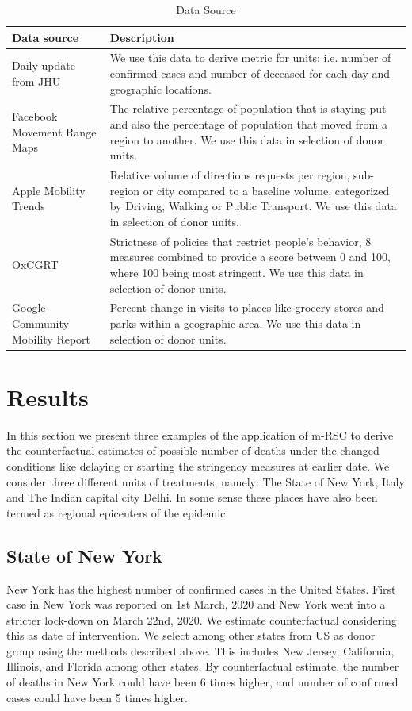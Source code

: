 \documentclass[preprint,authoryear,12pt]{elsarticle}
\begin{document}
	\begin{table}
		\centering
		\begin{tabularx}{0.9\textwidth}[t]{p{}X}
			\hline
			\textbf{Data source} &  \textbf{Description}\\ [0.5ex]
			\hline\hline
			Daily update from JHU  \cite{DDG2020}  & We use this data to derive metric for units: i.e. number of confirmed cases and number of deceased for each day and geographic locations.\\ [1ex]
			\hline
			Facebook Movement Range Maps \cite{JM2020} & The relative percentage of population that is staying put and also the percentage of population that moved from a region to another. We use this data in selection of donor units.\\
			\hline
			Apple Mobility Trends\cite{Apple2020} & Relative volume of directions requests per region, sub-region or city compared to a baseline volume, categorized by Driving, Walking or Public Transport. We use this data in selection of donor units.\\
			\hline
			OxCGRT  \cite{HWP2020} &  Strictness of policies that restrict people’s behavior, 8 measures combined to provide a score between 0 and 100, where 100 being most stringent. We use this data in selection of donor units.\\
			\hline
			Google Community Mobility Report \cite{Goog2020} &  Percent change in visits to places like grocery stores and parks within a geographic area. We use this data in selection of donor units.\\ [1ex] 
			\hline
		\end{tabularx}
		\caption{Data Source}
		\label{Table1}
	\end{table}
	 
\section{Results}
\label{SEC4}
In this section we present three examples of the application of m-RSC to derive the counterfactual estimates of possible number of deaths under the changed conditions like delaying or starting the stringency measures at earlier date. We consider three different units of treatments, namely: The State of New York, Italy and The Indian capital city Delhi. In some sense these places have also been termed as regional epicenters of the epidemic.

	\subsection{State of New York}
	New York has the highest number of confirmed cases in the United States. First case in New York was reported on 1st March, 2020 and New York went into a stricter lock-down on March 22nd, 2020. We estimate counterfactual considering this as date of intervention. We select among other states from US as donor group using the methods described above. This includes New Jersey, California, Illinois, and Florida among other states. By counterfactual estimate, the number of deaths in New York could have been 6 times higher, and number of confirmed cases could have been 5 times higher.
	
\end{document}
